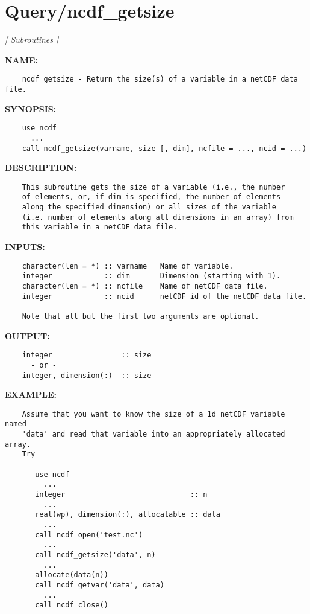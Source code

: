 \section{Query/ncdf\_getsize}
\textsl{[ Subroutines ]}

\label{ch:robo94}
\label{ch:Query_ncdf_getsize}
\textbf{NAME:}\hspace{0.08in}\begin{Verbatim}
    ncdf_getsize - Return the size(s) of a variable in a netCDF data file.
\end{Verbatim}
\textbf{SYNOPSIS:}\hspace{0.08in}\begin{Verbatim}
    use ncdf
      ...
    call ncdf_getsize(varname, size [, dim], ncfile = ..., ncid = ...)
\end{Verbatim}
\textbf{DESCRIPTION:}\hspace{0.08in}\begin{Verbatim}
    This subroutine gets the size of a variable (i.e., the number
    of elements, or, if dim is specified, the number of elements
    along the specified dimension) or all sizes of the variable
    (i.e. number of elements along all dimensions in an array) from
    this variable in a netCDF data file.
\end{Verbatim}
\textbf{INPUTS:}\hspace{0.08in}\begin{Verbatim}
    character(len = *) :: varname   Name of variable.
    integer            :: dim       Dimension (starting with 1).
    character(len = *) :: ncfile    Name of netCDF data file.
    integer            :: ncid      netCDF id of the netCDF data file.

    Note that all but the first two arguments are optional.
\end{Verbatim}
\textbf{OUTPUT:}\hspace{0.08in}\begin{Verbatim}
    integer                :: size
      - or -
    integer, dimension(:)  :: size
\end{Verbatim}
\textbf{EXAMPLE:}\hspace{0.08in}\begin{Verbatim}
    Assume that you want to know the size of a 1d netCDF variable named
    'data' and read that variable into an appropriately allocated array.
    Try

       use ncdf
         ...
       integer                             :: n
         ...
       real(wp), dimension(:), allocatable :: data
         ...
       call ncdf_open('test.nc')
         ...
       call ncdf_getsize('data', n)
         ...
       allocate(data(n))
       call ncdf_getvar('data', data)
         ...
       call ncdf_close()
\end{Verbatim}
